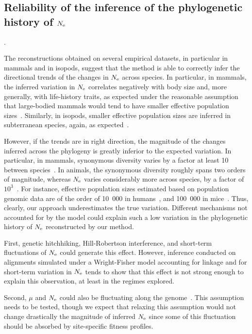 \subsection{Reliability of the inference of the phylogenetic history of \texorpdfstring{$N_{\text{e}}$}{Nₑ}}.

The reconstructions obtained on several empirical datasets, in particular in mammals and in isopods, suggest that the method is able to correctly infer the directional trends of the changes in $N_{\text{e}}$ across species.
In particular, in mammals, the inferred variation in $N_{\text{e}}$ correlates negatively with body size and, more generally, with life-history traits, as expected under the reasonable assumption that large-bodied mammals would tend to have smaller effective population sizes~\cite{Popadin2007,Lartillot2012,Nabholz2013,Figuet2017}.
Similarly, in isopods, smaller \glspl{effective population size} are inferred in subterranean species, again, as expected~\citep{Capderrey2013}.

However, if the trends are in right direction, the magnitude of the changes inferred across the phylogeny is greatly inferior to the expected variation.
In particular, in mammals, \gls{synonymous} diversity varies by a factor at least 10 between species~\citep{Galtier2016}.
In animals, the \gls{synonymous} diversity roughly spans two orders of magnitude, whereas $N_{\text{e}}$ varies considerably more across species, by a factor of $10^3$~\citep{Galtier2019}.
For instance, \glspl{effective population size} estimated based on population genomic data are of the order of 10~000 in humans~\citep{Li2011}, and 100~000 in mice~\citep{Geraldes2008}.
Thus, clearly, our approach underestimates the true variation.
Different mechanisms not accounted for by the model could explain such a low variation in the phylogenetic history of $N_{\text{e}}$ reconstructed by our method.

First, genetic hitchhiking, Hill-Robertson interference, and short-term fluctuations of $N_{\text{e}}$ could generate this effect.
However, inference conducted on alignments simulated under a Wright-Fisher model accounting for linkage and for short-term variation in $N_{\text{e}}$ tends to show that this effect is not strong enough to explain this observation, at least in the regimes explored.

Second, $\mu$ and $N_{\text{e}}$ could also be fluctuating along the genome~\citep{Gossmann2011,Ellegren2003,Eyre-Walker2014}.
This assumption needs to be tested, though we expect that relaxing this assumption would not change drastically the magnitude of inferred $N_{\text{e}}$ since some of this fluctuation should be absorbed by site-specific fitness profiles.

